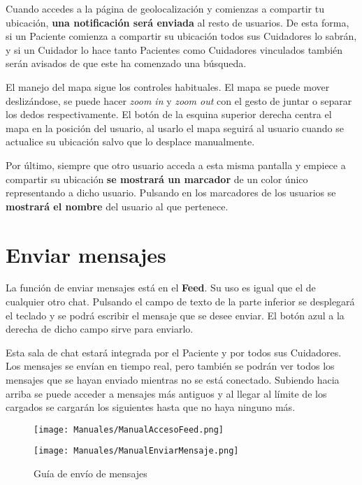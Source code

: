 Cuando accedes a la página de geolocalización y comienzas a compartir tu ubicación, \textbf{una notificación será enviada} al resto de usuarios. De esta forma, si un Paciente comienza a compartir su ubicación todos sus Cuidadores lo sabrán, y si un Cuidador lo hace tanto Pacientes como Cuidadores vinculados también serán avisados de que este ha comenzado una búsqueda.

El manejo del mapa sigue los controles habituales. El mapa se puede mover deslizándose, se puede hacer \emph{zoom in} y \emph{zoom out} con el gesto de juntar o separar los dedos respectivamente. El botón de la esquina superior derecha centra el mapa en la posición del usuario, al usarlo el mapa seguirá al usuario cuando se actualice su ubicación salvo que lo desplace manualmente.

Por último, siempre que otro usuario acceda a esta misma pantalla y empiece a compartir su ubicación \textbf{se mostrará un marcador} de un color único representando a dicho usuario. Pulsando en los marcadores de los usuarios se \textbf{mostrará el nombre} del usuario al que pertenece.

\section{Enviar mensajes}
\label{sec:manual_enviar_mensajes}

La función de enviar mensajes está en el \textbf{Feed}. Su uso es igual que el de cualquier otro chat. Pulsando el campo de texto de la parte inferior se desplegará el teclado y se podrá escribir el mensaje que se desee enviar. El botón azul a la derecha de dicho campo sirve para enviarlo.

Esta sala de chat estará integrada por el Paciente y por todos sus Cuidadores. Los mensajes se envían en tiempo real, pero también se podrán ver todos los mensajes que se hayan enviado mientras no se está conectado. Subiendo hacia arriba se puede acceder a mensajes más antiguos y al llegar al límite de los cargados se cargarán los siguientes hasta que no haya ninguno más.

\begin{figure}[h]
    \centering
    \begin{minipage}{0.5\textwidth}
        \centering
        \texttt{[image: Manuales/ManualAccesoFeed.png]}
    \end{minipage}\hfill
    \begin{minipage}{0.5\textwidth}
        \centering
        \texttt{[image: Manuales/ManualEnviarMensaje.png]}
    \end{minipage}\hfill
    \caption{Guía de envío de mensajes}
    \label{man:enviar_mensaje}
\end{figure}

